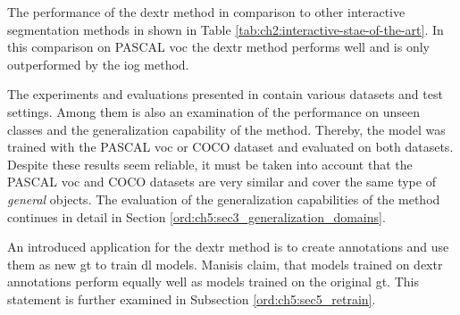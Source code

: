 The performance of the \gls{dextr} method in comparison to other interactive segmentation methods in shown in Table \ref{tab:ch2:interactive-stae-of-the-art}.
In this comparison on PASCAL \gls{voc} the \gls{dextr} method performs well and is only outperformed by the \gls{iog} method.

The experiments and evaluations presented in \cite{Man18-DEXTR} contain various datasets and test settings.
Among them is also an examination of the performance on unseen classes and the generalization capability of the method.
Thereby, the model was trained with the PASCAL \gls{voc} or COCO dataset and evaluated on both datasets.
Despite these results seem reliable, it must be taken into account that the PASCAL \gls{voc} and COCO datasets are very similar and cover the same type of \textit{general} objects.
The evaluation of the generalization capabilities of the method continues in detail in Section \ref{ord:ch5:sec3_generalization_domains}.

An introduced application for the \gls{dextr} method is to create annotations and use them as new \gls{gt} to train \gls{dl} models.
Manisis \etal claim, that models trained on \gls{dextr} annotations perform equally well as models trained on the original \gls{gt}\cite{Man18-DEXTR}.
This statement is further examined in Subsection \ref{ord:ch5:sec5_retrain}.
